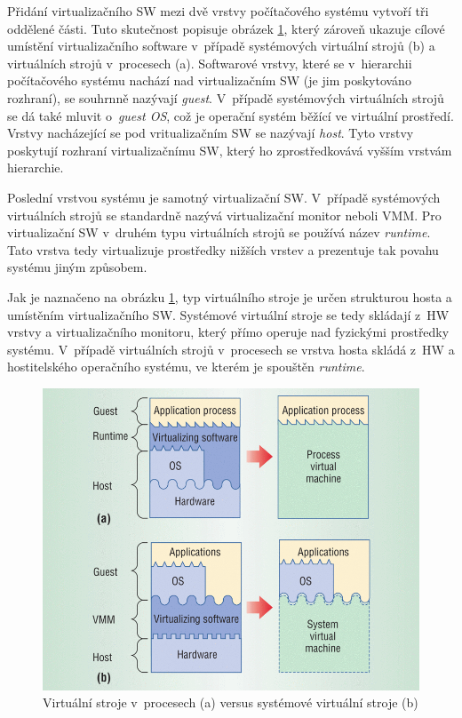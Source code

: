 Přidání virtualizačního SW mezi dvě vrstvy počítačového systému vytvoří tři oddělené části. Tuto skutečnost popisuje
obrázek \ref{figure:system_vs_proces}, který zároveň ukazuje cílové umístění virtualizačního software v~případě systémových
virtuální strojů (b) a virtuálních strojů v~procesech (a). Softwarové vrstvy, které se v~hierarchii počítačového systému nachází
nad virtualizačním SW (je jim poskytováno rozhraní), se souhrnně nazývají \textit{guest}. V~případě systémových virtuálních strojů
se dá také mluvit o~\textit{guest OS}, což je operační systém běžící ve virtuální prostředí. Vrstvy nacházející se pod vritualizačním
SW se nazývají \textit{host}. Tyto vrstvy poskytují rozhraní virtualizačnímu SW, který ho zprostředkovává vyšším vrstvám hierarchie.

Poslední vrstvou systému je samotný virtualizační SW. V~případě systémových virtuálních strojů se standardně nazývá virtualizační
monitor neboli VMM. Pro virtualizační SW v~druhém typu virtuálních strojů se používá název \textit{runtime}. Tato vrstva tedy
virtualizuje prostředky nižších vrstev a prezentuje tak povahu systému jiným způsobem. 

Jak je naznačeno na obrázku \ref{figure:system_vs_proces}, typ virtuálního stroje je určen strukturou hosta a umístěním virtualizačního
SW. Systémové virtuální stroje se tedy skládají z~HW vrstvy a virtualizačního monitoru, který přímo operuje nad fyzickými prostředky
systému. V~případě virtuálních strojů v~procesech se vrstva hosta skládá z~HW a hostitelského operačního systému, ve kterém je spouštěn
\textit{runtime}.
\begin{figure}
  \centering
  \includegraphics[scale=0.4]{assets/png/procesvm_vs_sysvm.png}
  \caption[Virtuální stroj v~procesu versus systémové virtuální stroje ]{Virtuální stroje v~procesech (a) versus systémové virtuální stroje (b) \cite{book:iee:vm_architecture}}
  \label{figure:system_vs_proces}
\end{figure}
